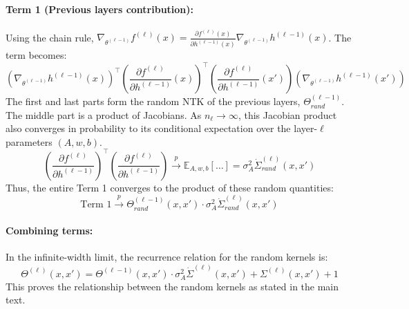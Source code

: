 \documentclass[a4paper]{article}
\begin{document}
\paragraph{Term 1 (Previous layers contribution):}
Using the chain rule, $\nabla_{\theta^{(\ell-1)}} f^{(\ell)}(x) = \frac{\partial f^{(\ell)}(x)}{\partial h^{(\ell-1)}(x)} \nabla_{\theta^{(\ell-1)}} h^{(\ell-1)}(x)$. The term becomes:
\[ (\nabla_{\theta^{(\ell-1)}} h^{(\ell-1)}(x))^\top \left(\frac{\partial f^{(\ell)}}{\partial h^{(\ell-1)}}(x)\right)^\top \left(\frac{\partial f^{(\ell)}}{\partial h^{(\ell-1)}}(x')\right) (\nabla_{\theta^{(\ell-1)}} h^{(\ell-1)}(x')) \]
The first and last parts form the random NTK of the previous layers, $\Theta^{(\ell-1)}_{rand}$. The middle part is a product of Jacobians. As $n_\ell \to \infty$, this Jacobian product also converges in probability to its conditional expectation over the layer-$\ell$ parameters $(A, w, b)$.
\[ \left(\frac{\partial f^{(\ell)}}{\partial h^{(\ell-1)}}\right)^\top \left(\frac{\partial f^{(\ell)}}{\partial h^{(\ell-1)}}\right) \xrightarrow{p} \mathbb{E}_{A,w,b} \left[ \dots \right] = \sigma_A^2 \dot{\Sigma}^{(\ell)}_{rand}(x, x') \]
Thus, the entire Term 1 converges to the product of these random quantities:
\[ \text{Term 1} \xrightarrow{p} \Theta^{(\ell-1)}_{rand}(x, x') \cdot \sigma_A^2 \dot{\Sigma}^{(\ell)}_{rand}(x, x') \]

\paragraph{Combining terms:}
In the infinite-width limit, the recurrence relation for the random kernels is:
\[ \Theta^{(\ell)}(x, x') = \Theta^{(\ell-1)}(x, x') \cdot \sigma_A^2 \dot{\Sigma}^{(\ell)}(x, x') + \Sigma^{(\ell)}(x, x') + 1\]
This proves the relationship between the random kernels as stated in the main text.
\end{document}
